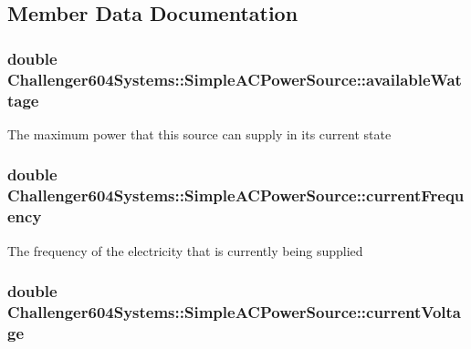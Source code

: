 \subsection{Member Data Documentation}
\hypertarget{class_challenger604_systems_1_1_simple_a_c_power_source_af9aab8bb1f32a240aba9b6c4ac969ba9}{
\subsubsection[{available\-Wattage}]{\setlength{\rightskip}{0pt plus 5cm}double Challenger604\-Systems\-::\-Simple\-A\-C\-Power\-Source\-::available\-Wattage\hspace{0.3cm}{\ttfamily [protected]}}}\label{class_challenger604_systems_1_1_simple_a_c_power_source_af9aab8bb1f32a240aba9b6c4ac969ba9}
The maximum power that this source can supply in its current state \hypertarget{class_challenger604_systems_1_1_simple_a_c_power_source_a321cb77fea6e9d7a79fd69d2bd7a7227}{
\subsubsection[{current\-Frequency}]{\setlength{\rightskip}{0pt plus 5cm}double Challenger604\-Systems\-::\-Simple\-A\-C\-Power\-Source\-::current\-Frequency\hspace{0.3cm}{\ttfamily [protected]}}}\label{class_challenger604_systems_1_1_simple_a_c_power_source_a321cb77fea6e9d7a79fd69d2bd7a7227}
The frequency of the electricity that is currently being supplied \hypertarget{class_challenger604_systems_1_1_simple_a_c_power_source_a10506cd4ead6a716f150baaaa4c56888}{
\subsubsection[{current\-Voltage}]{\setlength{\rightskip}{0pt plus 5cm}double Challenger604\-Systems\-::\-Simple\-A\-C\-Power\-Source\-::current\-Voltage\hspace{0.3cm}{\ttfamily [protected]}}}\label{class_challenger604_systems_1_1_simple_a_c_power_source_a10506cd4ead6a716f150baaaa4c56888}
